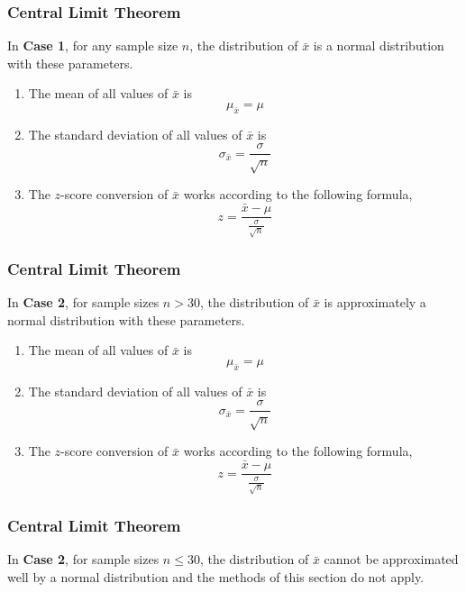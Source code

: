 \documentclass[xcolor=dvipsnames]{beamer}
\begin{document}
\begin{frame}
  \frametitle{Central Limit Theorem}
In \textbf{Case 1}, for \alert{any sample size $n$}, the distribution
of $\bar{x}$ is a \alert{normal distribution} with these parameters.
\begin{enumerate}
\item<1-> The mean of all values of $\bar{x}$ is
\begin{equation}
  \label{eq:wecoutha}
  \mu_{\bar{x}}=\mu
\end{equation}
\item<2-> The standard deviation of all values of $\bar{x}$ is
\begin{equation}
  \label{eq:aunijeeb}
  \sigma_{\bar{x}}=\frac{\sigma}{\sqrt{n}}
\end{equation}
\item<3-> The $z$-score conversion of $\bar{x}$ works according to the
following formula,
\begin{equation}
  \label{eq:aivashah}
  z=\frac{\bar{x}-\mu}{\frac{\sigma}{\sqrt{n}}}
\end{equation}
\end{enumerate}
\end{frame}

\begin{frame}
  \frametitle{Central Limit Theorem}
In \textbf{Case 2}, for \alert{sample sizes $n>30$}, the distribution
of $\bar{x}$ is  \alert{approximately a normal distribution} with these parameters.
\begin{enumerate}
\item The mean of all values of $\bar{x}$ is
\begin{equation}
  \label{eq:chaghiec}
  \mu_{\bar{x}}=\mu
\end{equation}
\item The standard deviation of all values of $\bar{x}$ is
\begin{equation}
  \label{eq:ooloogha}
  \sigma_{\bar{x}}=\frac{\sigma}{\sqrt{n}}
\end{equation}
\item The $z$-score conversion of $\bar{x}$ works according to the
following formula,
\begin{equation}
  \label{eq:yohthoug}
  z=\frac{\bar{x}-\mu}{\frac{\sigma}{\sqrt{n}}}
\end{equation}
\end{enumerate}
\end{frame}

\begin{frame}
  \frametitle{Central Limit Theorem}
In \textbf{Case 2}, for \alert{sample sizes $n\leq{}30$}, the distribution
of $\bar{x}$ cannot be approximated well by a normal distribution and
the methods of this section do not apply.
\end{frame}
\end{document}
